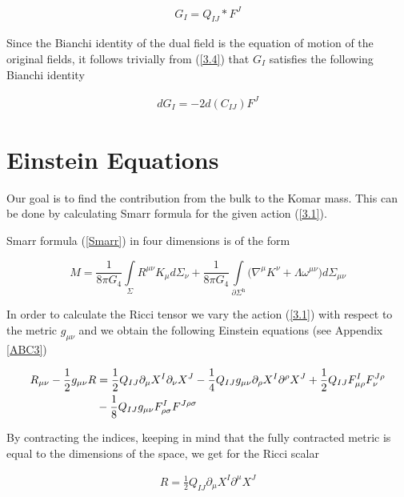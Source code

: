 \documentclass[a4paper,notitlepage]{report}
\begin{document}
\begin{align} \label{3.5}
G_I = Q_{IJ} *F^J 
\end{align}

\vspace{0.5 em}
Since the Bianchi identity of the dual field is the equation of motion of the original fields, it follows trivially from (\ref{3.4}) that $G_I$ satisfies the following Bianchi identity

\begin{align} \label{3.6}
dG_I = - 2 d(C_{IJ}) F^J 
\end{align}

\section{Einstein Equations}

Our goal is to find the contribution from the bulk to the Komar mass. This can be done by calculating Smarr formula for the given action (\ref{3.1}). 

Smarr formula (\ref{Smarr}) in four dimensions is of the form

\begin{equation}\label{3.7}
M = \frac{1}{8\pi G_{4}} \int\limits_{\Sigma} R^{\mu\nu} K_{\mu} d\Sigma_{\nu} + \frac{1}{8\pi G_{4}} \int\limits_{\partial \Sigma^{\text{h}}} \Big( \nabla^{\mu} K^{\nu} + \Lambda \omega^{\mu\nu} \Big) d\Sigma_{\mu\nu}
\end{equation}

\vspace{0.5 em}
In order to calculate the Ricci tensor we vary the action (\ref{3.1}) with respect to the metric $g_{\mu \nu}$ and we obtain the following Einstein equations (see Appendix  \ref{ABC3})

\begin{align}\label{3.8}
R_{\mu\nu} - \frac{1}{2} g_{\mu\nu}R &= \frac{1}{2} Q_{IJ} \partial_{\mu} X^I \partial_{\nu} X^J - \frac{1}{4} Q_{IJ} g_{\mu\nu} \partial_{\rho} X^I \partial^{\rho} X^J + \frac{1}{2} Q_{IJ} F^I_{\mu\rho} F^{J\rho}_\nu \notag\\
& - \frac{1}{8} Q_{IJ} g_{\mu\nu}  F^{I}_{\rho\sigma} F^{J\rho\sigma}
\end{align}

\vspace{0.5 em}
By contracting the indices, keeping in mind that the fully contracted metric is equal to the dimensions of the space, we get for the Ricci scalar

\begin{align}\label{3.9}
R = \frac{1}{2} Q_{IJ} \partial_{\mu} X^I \partial^{\mu} X^J
\end{align}
\end{document}
